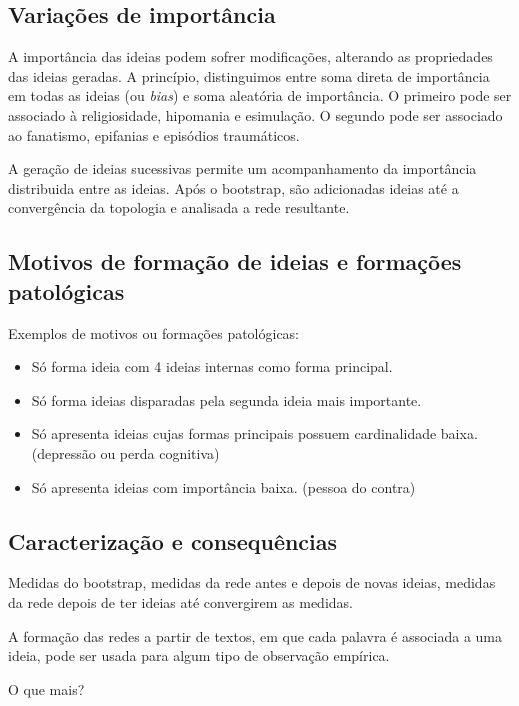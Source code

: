 \documentclass[a4paper,12pt,titlepage]{article}
\begin{document}
\subsection{Variações de importância}
A importância das ideias podem sofrer modificações, alterando as propriedades
das ideias geradas. A princípio, distinguimos entre soma direta de importância em todas
as ideias (ou \emph{bias}) e soma aleatória de importância. O primeiro pode ser associado
à religiosidade, hipomania e esimulação. O segundo pode ser associado ao fanatismo,
epifanias e episódios traumáticos.

A geração de ideias sucessivas permite um acompanhamento da importância distribuida
entre as ideias. Após o bootstrap, são adicionadas ideias até a convergência da topologia
e analisada a rede resultante.

\subsection{Motivos de formação de ideias e formações patológicas}
Exemplos de motivos ou formações patológicas:
\begin{itemize}
    \item Só forma ideia com 4 ideias internas como forma principal.
    \item Só forma ideias disparadas pela segunda ideia mais importante.
    \item Só apresenta ideias cujas formas principais possuem cardinalidade baixa. (depressão ou perda cognitiva)
    \item Só apresenta ideias com importância baixa. (pessoa do contra)
\end{itemize}

\subsection{Caracterização e consequências}
Medidas do bootstrap, medidas da rede antes e depois de novas ideias, medidas da rede depois
de ter ideias até convergirem as medidas. 

A formação das redes a partir de textos, em que cada palavra é associada a uma ideia, pode ser usada para algum tipo de observação empírica.

O que mais?
\end{document}
